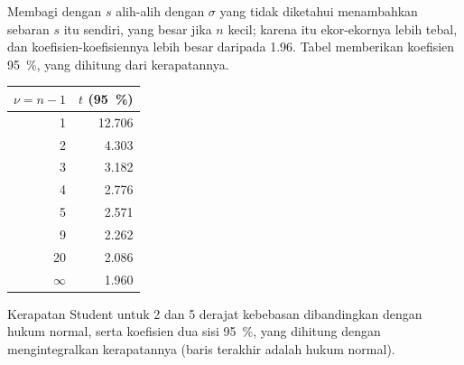 \admitted

Membagi dengan $s$ alih-alih dengan $\sigma$ yang tidak diketahui
menambahkan sebaran $s$ itu sendiri, yang besar jika $n$ kecil; karena itu
ekor-ekornya lebih tebal, dan koefisien-koefisiennya lebih besar daripada
1.96. Tabel memberikan koefisien
95~\%, yang dihitung dari kerapatannya.

\begin{omfigure}
\begin{minipage}[c]{0.56\linewidth}
\end{minipage}\hfill
\begin{minipage}[c]{0.4\linewidth}\centering
\small
\begin{tabular}{rr}
\hline
$\nu = n - 1$ & $t$ (95~\%) \\
\hline
1 & 12.706 \\
2 & 4.303 \\
3 & 3.182 \\
4 & 2.776 \\
5 & 2.571 \\
9 & 2.262 \\
20 & 2.086 \\
$\infty$ & 1.960 \\
\hline
\end{tabular}
\end{minipage}
\par\vspace{4pt}

{\small Kerapatan Student untuk 2 dan 5 derajat kebebasan dibandingkan dengan
hukum normal, serta koefisien dua sisi
95~\%, yang dihitung dengan mengintegralkan kerapatannya (baris terakhir
adalah hukum normal).}
\end{omfigure}

